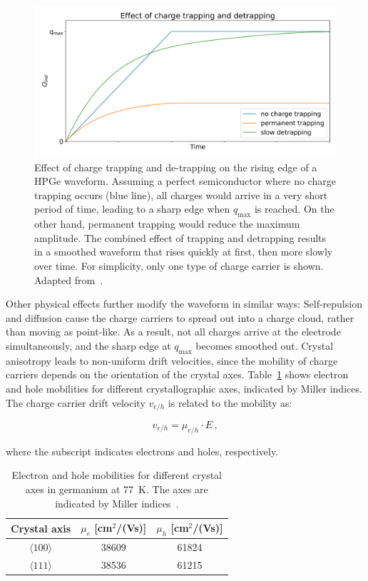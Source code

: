 \begin{figure}
    \centering
    \includegraphics[width=0.75\linewidth]{figures/03_legend/Plot_charge_trapping.png}
    \caption{Effect of charge trapping and de-trapping on the rising edge of a HPGe waveform. Assuming a perfect semiconductor where no charge trapping occurs (blue line), all charges would arrive in a very short period of time, leading to a sharp edge when $q_{\mathrm{max}}$ is reached. On the other hand, permanent trapping would reduce the maximum amplitude. The combined effect of trapping and detrapping results in a smoothed waveform that rises quickly at first, then more slowly over time. For simplicity, only one type of charge carrier is shown. Adapted from~\cite{knoll_radiation_2000}.}
\label{fig:trapping_detrapping}
\end{figure}

Other physical effects further modify the waveform in similar ways: 
Self-repulsion and diffusion cause the charge carriers to spread out into a charge cloud, rather than moving as point-like. As a result, not all charges arrive at the electrode simultaneously, and the sharp edge at $q_{\mathrm{max}}$ becomes smoothed out.
Crystal anisotropy leads to non-uniform drift velocities, since the mobility of charge carriers depends on the orientation of the crystal axes. Table~\ref{tab:charge_mobility} shows electron and hole mobilities for different crystallographic axes, indicated by Miller indices. The charge carrier drift velocity $v_{e/h}$ is related to the mobility as:

\begin{equation}
\label{eq:velocity_mobility}
    v_{e/h} = \mu_{e/h} \cdot E \,,
\end{equation}

\noindent where the subscript indicates electrons and holes, respectively.

\begin{table}
\centering
\caption{Electron and hole mobilities for different crystal axes in germanium at 77~K. The axes are indicated by Miller indices~\cite{Abt_2023}.} 
\label{tab:charge_mobility}
\begin{tabular}{|c | c | c |}
	\hline
    \textbf{Crystal axis} & \textbf{$\mu_e$ [cm$^2$/(Vs)]} & \textbf{$\mu_h$ [cm$^2$/(Vs)]} \\
    \hline
    $\langle100\rangle$ & 38609 & 61824 \\
    \hline
    $\langle111\rangle$ & 38536  & 61215 \\ 
    \hline
\end{tabular}
\end{table}


